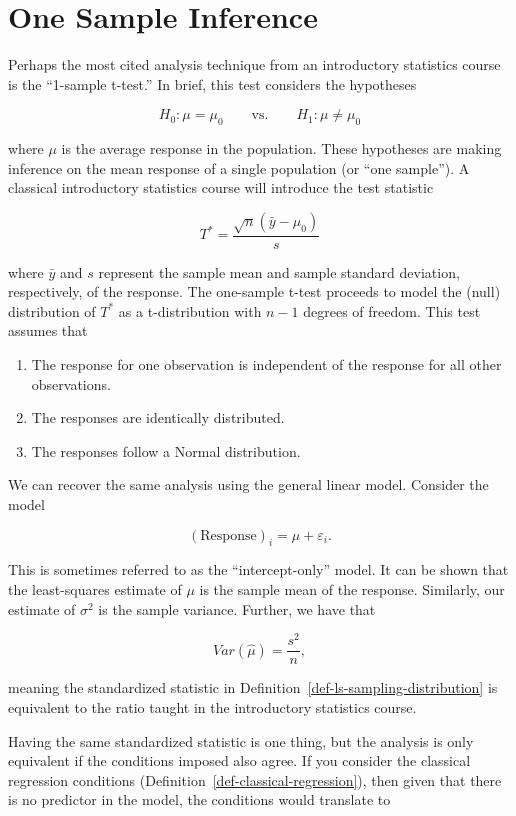 \documentclass[
  letterpaper,
  DIV=11,
  numbers=noendperiod]{scrreprt}
\providecommand{\tightlist}{%
  \setlength{\itemsep}{0pt}\setlength{\parskip}{0pt}}\usepackage{longtable,booktabs,array}
\theoremstyle{definition}
\theoremstyle{definition}
\theoremstyle{remark}
\begin{document}
\hypertarget{one-sample-inference}{%
\section{One Sample Inference}\label{one-sample-inference}}

Perhaps the most cited analysis technique from an introductory
statistics course is the ``1-sample t-test.'' In brief, this test
considers the hypotheses

\[H_0: \mu = \mu_0 \qquad \text{vs.} \qquad H_1: \mu \neq \mu_0\]

where \(\mu\) is the average response in the population. These
hypotheses are making inference on the mean response of a single
population (or ``one sample''). A classical introductory statistics
course will introduce the test statistic

\[T^* = \frac{\sqrt{n} \left(\bar{y} - \mu_0\right)}{s}\]

where \(\bar{y}\) and \(s\) represent the sample mean and sample
standard deviation, respectively, of the response. The one-sample t-test
proceeds to model the (null) distribution of \(T^*\) as a t-distribution
with \(n - 1\) degrees of freedom. This test assumes that

\begin{enumerate}
\def\labelenumi{\arabic{enumi}.}
\tightlist
\item
  The response for one observation is independent of the response for
  all other observations.
\item
  The responses are identically distributed.
\item
  The responses follow a Normal distribution.
\end{enumerate}

We can recover the same analysis using the general linear model.
Consider the model

\[(\text{Response})_i = \mu + \varepsilon_i.\]

This is sometimes referred to as the ``intercept-only'' model. It can be
shown that the least-squares estimate of \(\mu\) is the sample mean of
the response. Similarly, our estimate of \(\sigma^2\) is the sample
variance. Further, we have that

\[Var\left(\widehat{\mu}\right) = \frac{s^2}{n},\]

meaning the standardized statistic in
Definition~\ref{def-ls-sampling-distribution} is equivalent to the ratio
taught in the introductory statistics course.

Having the same standardized statistic is one thing, but the analysis is
only equivalent if the conditions imposed also agree. If you consider
the classical regression conditions
(Definition~\ref{def-classical-regression}), then given that there is no
predictor in the model, the conditions would translate to
\end{document}
